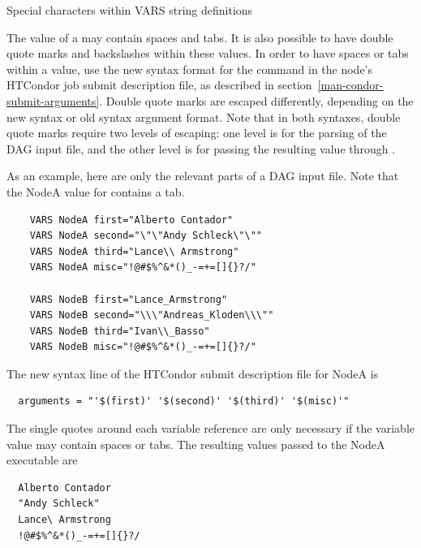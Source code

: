 \begin{description}
\item[Special characters within VARS string definitions]
\end{description}

The value of a   may contain spaces and tabs.
It is also possible to have double quote marks and
backslashes within these values.
In order to have spaces or tabs within a value,
use the new syntax format for the  command
in the node's HTCondor job submit description file,
as described in section~\ref{man-condor-submit-arguments}.
Double quote marks are escaped differently,
depending on the new syntax or old syntax argument format.
Note that in both syntaxes,
double quote marks require two levels of escaping:
one level is for the parsing of the DAG input file, and the other level is for
passing the resulting value through .

As an example, here are only the relevant parts of a DAG input file.
Note that the NodeA value for  contains a tab.
\footnotesize
\begin{verbatim}
    VARS NodeA first="Alberto Contador"
    VARS NodeA second="\"\"Andy	Schleck\"\""
    VARS NodeA third="Lance\\ Armstrong"
    VARS NodeA misc="!@#$%^&*()_-=+=[]{}?/"
    
    VARS NodeB first="Lance_Armstrong"
    VARS NodeB second="\\\"Andreas_Kloden\\\""
    VARS NodeB third="Ivan\\_Basso"
    VARS NodeB misc="!@#$%^&*()_-=+=[]{}?/"
\end{verbatim}
\normalsize

The new syntax  line of the HTCondor submit description file
for NodeA is
\footnotesize
\begin{verbatim}
  arguments = "'$(first)' '$(second)' '$(third)' '$(misc)'"
\end{verbatim}
\normalsize
The single quotes around each variable reference are only necessary
if the variable value may contain spaces or tabs.
The resulting values passed to the NodeA executable are
\footnotesize
\begin{verbatim}
  Alberto Contador
  "Andy	Schleck"
  Lance\ Armstrong
  !@#$%^&*()_-=+=[]{}?/
\end{verbatim}
\normalsize

